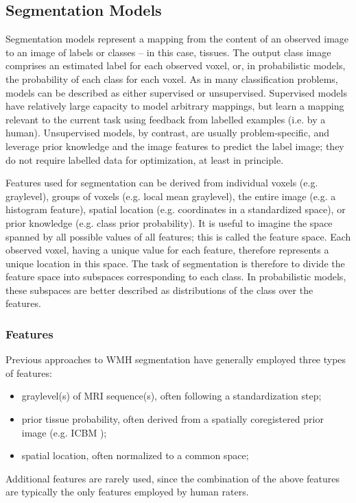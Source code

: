\subsection{Segmentation Models}
Segmentation models represent a mapping from the content of an observed image to an image of labels or classes -- in this case, tissues. The output class image comprises an estimated label for each observed voxel, or, in probabilistic models, the probability of each class for each voxel. As in many classification problems, models can be described as either supervised or unsupervised. Supervised models have relatively large capacity to model arbitrary mappings, but learn a mapping relevant to the current task using feedback from labelled examples (i.e. by a human). Unsupervised models, by contrast, are usually problem-specific, and leverage prior knowledge and the image features to predict the label image; they do not require labelled data for optimization, at least in principle. 
\par
Features used for segmentation can be derived from individual voxels (e.g. graylevel), groups of voxels (e.g. local mean graylevel), the entire image (e.g. a histogram feature), spatial location (e.g. coordinates in a standardized space), or prior knowledge (e.g. class prior probability). It is useful to imagine the space spanned by all possible values of all features; this is called the feature space. Each observed voxel, having a unique value for each feature, therefore represents a unique location in this space. The task of segmentation is therefore to divide the feature space into subspaces corresponding to each class. In probabilistic models, these subspaces are better described as distributions of the class over the features.
\subsubsection{Features}
Previous approaches to WMH segmentation have generally employed three types of features:
\begin{itemize}
  \item graylevel(s) of MRI sequence(s), often following a standardization step;
  \item prior tissue probability, often derived from a spatially coregistered prior image (e.g. ICBM \cite{Mazziotta2001});
  \item spatial location, often normalized to a common space;
\end{itemize}
Additional features are rarely used, since the combination of the above features are typically the only features employed by human raters.
